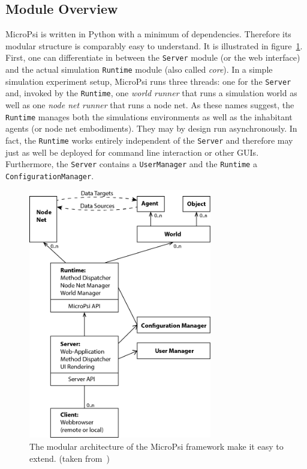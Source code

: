         \subsection{Module Overview}
MicroPsi is written in Python with a minimum of dependencies. Therefore its  modular structure is comparably easy to understand. It is illustrated in figure~\ref{micropsi2_modules}. First, one can differentiate in between the \texttt{Server} module (or the web interface) and the actual simulation \texttt{Runtime} module (also called \emph{core}). In a simple simulation experiment setup, MicroPsi runs three threads: one for the \texttt{Server} and, invoked by the \texttt{Runtime}, one \emph{world runner} that runs a simulation world as well as one \emph{node net runner} that runs a node net. As these names suggest, the \texttt{Runtime} manages both the simulations environments as well as the inhabitant agents (or node net embodiments). They may by design run asynchronously. In fact, the \texttt{Runtime} works entirely independent of the \texttt{Server} and therefore may just as well be deployed for command line interaction or other GUIs. Furthermore, the \texttt{Server} contains a \texttt{UserManager} and the \texttt{Runtime} a \texttt{ConfigurationManager}.~\cite{conf/agi/Bach12}
\\          
          
\begin{figure}[h]
  \centering
    \includegraphics[width=8cm]{graphics/micropsi2_uml}
  \caption{The modular architecture of the MicroPsi framework make it easy to extend. (taken from~\cite{conf/agi/Bach12})}
  \label{micropsi2_modules}
\end{figure}

